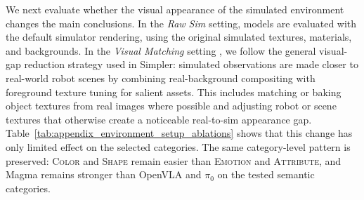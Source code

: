 \documentclass{llmxive}
\begin{document}
We next evaluate whether the visual appearance of the simulated environment changes the main conclusions.
In the \emph{Raw Sim} setting, models are evaluated with the default simulator rendering, using the original simulated textures, materials, and backgrounds.
In the \emph{Visual Matching} setting \cite{simpler}, we follow the general visual-gap reduction strategy used in Simpler: simulated observations are made closer to real-world robot scenes by combining real-background compositing with foreground texture tuning for salient assets.
This includes matching or baking object textures from real images where possible and adjusting robot or scene textures that otherwise create a noticeable real-to-sim appearance gap.
Table~\ref{tab:appendix_environment_setup_ablations} shows that this change has only limited effect on the selected categories.
The same category-level pattern is preserved: \textsc{Color} and \textsc{Shape} remain easier than \textsc{Emotion} and \textsc{Attribute}, and Magma remains stronger than OpenVLA and $\pi_0$ on the tested semantic categories.
\end{document}
